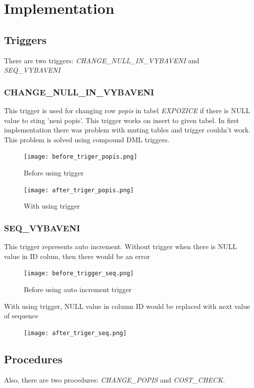 \documentclass[12pt,a4paper]{article}
\begin{document}
\section{Implementation}

\subsection{Triggers}

There are two triggers: \textit{CHANGE\_NULL\_IN\_VYBAVENI} and 
\textit{SEQ\_VYBAVENI}

\subsubsection{CHANGE\_NULL\_IN\_VYBAVENI}

This trigger is used for changing row \textit{popis} in tabel \textit{EXPOZICE} 
if there is NULL value to sting 'neni popis'. This trigger works on insert to 
given tabel. In first implementation there was problem with muting tables and 
trigger couldn't work. This problem is solved using compound DML triggers.
\begin{figure}[h!]
    \centering
        \texttt{[image: before\_triger\_popis.png]}
        \caption{Before using trigger}
        
        \texttt{[image: after\_triger\_popis.png]}
        \caption{With using trigger}
\end{figure}

\newpage
\subsubsection{SEQ\_VYBAVENI}

This trigger represents auto increment. Without trigger when there is NULL value 
in ID colum, then there would be an error
\begin{figure}[h!]
    \centering
    \texttt{[image: before\_trigger\_seq.png]}
    \caption{Before using auto increment trigger}
\end{figure}

\noindent With using trigger, NULL value in column ID would be replaced with next value 
of sequence
\begin{figure}[h!]
    \centering
    \texttt{[image: after\_triger\_seq.png]}
\end{figure}

\newpage

\subsection{Procedures}
Also, there are two procedures: \textit{CHANGE\_POPIS} and \textit{COST\_CHECK}.
\end{document}
